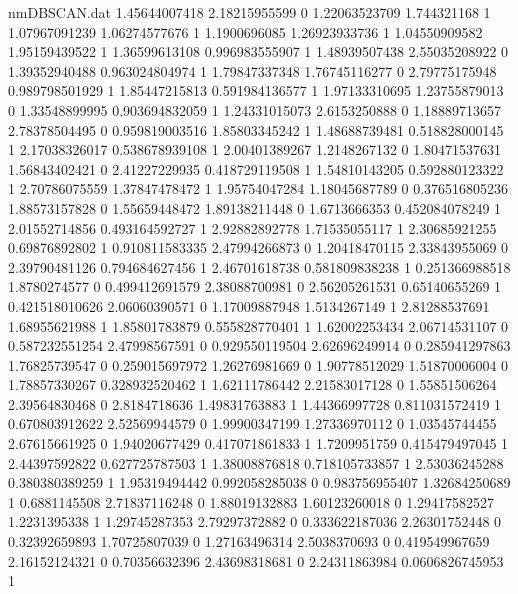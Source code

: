 \begin{filecontents}{nmDBSCAN.dat}
1.45644007418 2.18215955599 0
1.22063523709 1.744321168 1
1.07967091239 1.06274577676 1
1.1900696085 1.26923933736 1
1.04550909582 1.95159439522 1
1.36599613108 0.996983555907 1
1.48939507438 2.55035208922 0
1.39352940488 0.963024804974 1
1.79847337348 1.76745116277 0
2.79775175948 0.989798501929 1
1.85447215813 0.591984136577 1
1.97133310695 1.23755879013 0
1.33548899995 0.903694832059 1
1.24331015073 2.6153250888 0
1.18889713657 2.78378504495 0
0.959819003516 1.85803345242 1
1.48688739481 0.518828000145 1
2.17038326017 0.538678939108 1
2.00401389267 1.2148267132 0
1.80471537631 1.56843402421 0
2.41227229935 0.418729119508 1
1.54810143205 0.592880123322 1
2.70786075559 1.37847478472 1
1.95754047284 1.18045687789 0
0.376516805236 1.88573157828 0
1.55659448472 1.89138211448 0
1.6713666353 0.452084078249 1
2.01552714856 0.493164592727 1
2.92882892778 1.71535055117 1
2.30685921255 0.69876892802 1
0.910811583335 2.47994266873 0
1.20418470115 2.33843955069 0
2.39790481126 0.794684627456 1
2.46701618738 0.581809838238 1
0.251366988518 1.8780274577 0
0.499412691579 2.38088700981 0
2.56205261531 0.65140655269 1
0.421518010626 2.06060390571 0
1.17009887948 1.5134267149 1
2.81288537691 1.68955621988 1
1.85801783879 0.555828770401 1
1.62002253434 2.06714531107 0
0.587232551254 2.47998567591 0
0.929550119504 2.62696249914 0
0.285941297863 1.76825739547 0
0.259015697972 1.26276981669 0
1.90778512029 1.51870006004 0
1.78857330267 0.328932520462 1
1.62111786442 2.21583017128 0
1.55851506264 2.39564830468 0
2.8184718636 1.49831763883 1
1.44366997728 0.811031572419 1
0.670803912622 2.52569944579 0
1.99900347199 1.27336970112 0
1.03545744455 2.67615661925 0
1.94020677429 0.417071861833 1
1.7209951759 0.415479497045 1
2.44397592822 0.627725787503 1
1.38008876818 0.718105733857 1
2.53036245288 0.380380389259 1
1.95319494442 0.992058285038 0
0.983756955407 1.32684250689 1
0.6881145508 2.71837116248 0
1.88019132883 1.60123260018 0
1.29417582527 1.2231395338 1
1.29745287353 2.79297372882 0
0.333622187036 2.26301752448 0
0.32392659893 1.70725807039 0
1.27163496314 2.5038370693 0
0.419549967659 2.16152124321 0
0.70356632396 2.43698318681 0
2.24311863984 0.0606826745953 1
\end{filecontents}
